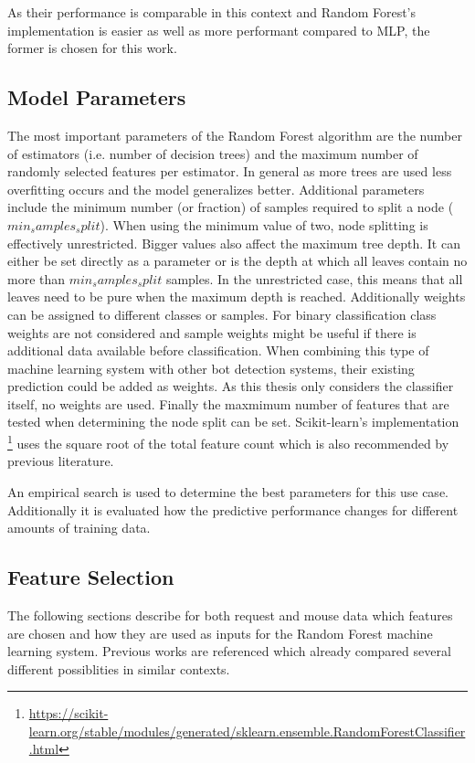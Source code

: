\documentclass[
    fontsize=12pt,
    headings=small,
    parskip=half,           %
    bibliography=totoc,
    numbers=noenddot,       %
    open=any,               %
    final,                   %
    table
]{scrreprt}
\begin{document}
As their performance is comparable in this context and Random Forest's implementation is easier as well as more performant compared to MLP, the former is chosen for this work.

\subsection{Model Parameters}

The most important parameters of the Random Forest algorithm are the number of estimators (i.e. number of decision trees) and the maximum number of randomly selected features per estimator. In general as more trees are used less overfitting occurs and the model generalizes better. Additional parameters include the minimum number (or fraction) of samples required to split a node ($min_samples_split$). When using the minimum value of two, node splitting is effectively unrestricted. Bigger values also affect the maximum tree depth. It can either be set directly as a parameter or is the depth at which all leaves contain no more than $min_samples_split$ samples. In the unrestricted case, this means that all leaves need to be pure when the maximum depth is reached. Additionally weights can be assigned to different classes or samples. For binary classification class weights are not considered and sample weights might be useful if there is additional data available before classification. When combining this type of machine learning system with other bot detection systems, their existing prediction could be added as weights. As this thesis only considers the classifier itself, no weights are used. Finally the maxmimum number of features that are tested when determining the node split can be set. Scikit-learn's implementation \footnote{\url{https://scikit-learn.org/stable/modules/generated/sklearn.ensemble.RandomForestClassifier.html}} uses the square root of the total feature count which is also recommended by previous literature. \cite{Hastie2009}

An empirical search is used to determine the best parameters for this use case. Additionally it is evaluated how the predictive performance changes for different amounts of training data.

\subsection{Feature Selection}

The following sections describe for both request and mouse data which features are chosen and how they are used as inputs for the Random Forest machine learning system. Previous works are referenced which already compared several different possiblities in similar contexts.
\end{document}
